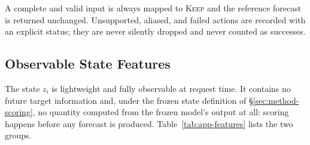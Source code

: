 \documentclass{article}
\begin{document}
\begin{table}[h]
  \caption{The five legal governance actions. ``Observed entries'' refers to entries that
  are present and valid in $X_i^{a_0}$; an action that modified them would be a data
  integrity violation regardless of its forecasting effect.}
  \label{tab:app-catalog}
  \centering
  \small
  \setlength{\tabcolsep}{4pt}
\end{table}

A complete and valid input is always mapped to \textsc{Keep} and the reference forecast is
returned unchanged. Unsupported, aliased, and failed actions are recorded with an explicit
status; they are never silently dropped and never counted as successes.

\subsection{Observable State Features}
\label{app:features}
The state $z_i$ is lightweight and fully observable at request time. It contains no future
target information and, under the frozen state definition of \S\ref{sec:method-scoring}, no
quantity computed from the frozen model's output at all: scoring happens before any forecast
is produced. Table~\ref{tab:app-features} lists the two groups.
\end{document}
